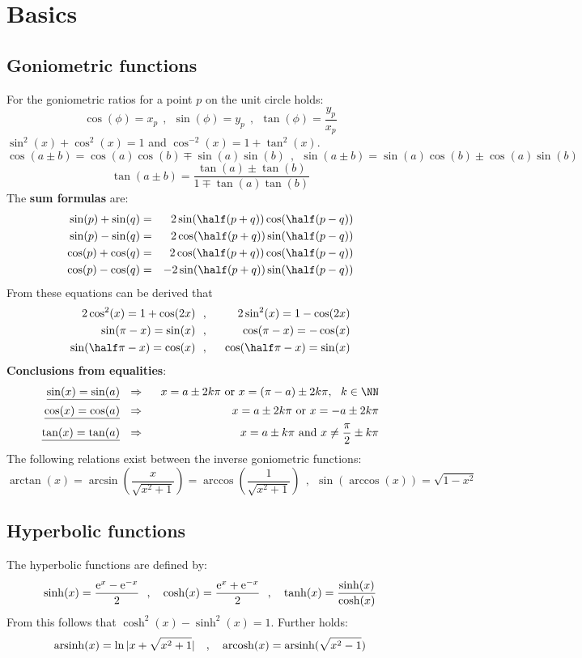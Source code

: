 \chapter{Basics}
\section{Goniometric functions}
For the goniometric ratios for a point $p$ on the unit circle holds:
\[
\cos(\phi)=x_p~~,~~\sin(\phi)=y_p~~,~~\tan(\phi)=\frac{y_p}{x_p}
\]
$\sin^2(x)+\cos^2(x)=1$ and $\cos^{-2}(x)=1+\tan^2(x)$.
\[
\cos(a\pm b)=\cos(a)\cos(b)\mp\sin(a)\sin(b)~~,~~
\sin(a\pm b)=\sin(a)\cos(b)\pm\cos(a)\sin(b)
\]
\[
\tan(a\pm b)=\frac{\tan(a)\pm\tan(b)}{1\mp\tan(a)\tan(b)}
\]
The {\bf sum formulas} are:
\begin{eqnarray*}
\sin(p)+\sin(q)&=&2\sin(\half(p+q))\cos(\half(p-q))\\
\sin(p)-\sin(q)&=&2\cos(\half(p+q))\sin(\half(p-q))\\
\cos(p)+\cos(q)&=&2\cos(\half(p+q))\cos(\half(p-q))\\
\cos(p)-\cos(q)&=&-2\sin(\half(p+q))\sin(\half(p-q))\\
\end{eqnarray*}
From these equations can be derived that
\begin{eqnarray*}
2\cos^2(x)=1+\cos(2x)   &~~,~~&2\sin^2(x)=1-\cos(2x)\\
\sin(\pi-x)=\sin(x)     &~~,~~&\cos(\pi-x)=-\cos(x)\\
\sin(\half\pi-x)=\cos(x)&~~,~~&\cos(\half\pi-x)=\sin(x)
\end{eqnarray*}
{\bf Conclusions from equalities}:
\begin{eqnarray*}
\underline{\sin(x)=\sin(a)}&~~\Rightarrow~~&x=a\pm2k\pi\mbox{ or }x=(\pi-a)\pm2k\pi,~~k\in\NN\\
\underline{\cos(x)=\cos(a)}&~~\Rightarrow~~&x=a\pm2k\pi\mbox{ or }x=-a\pm2k\pi\\
\underline{\tan(x)=\tan(a)}&~~\Rightarrow~~&x=a\pm k\pi\mbox{ and }x\neq\frac{\pi}{2}\pm k\pi
\end{eqnarray*}
The following relations exist between the inverse goniometric functions:
\[
\arctan(x)=\arcsin\left(\frac{x}{\sqrt{x^2+1}}\right)=\arccos\left(\frac{1}{\sqrt{x^2+1}}\right)~~,~~
\sin(\arccos(x))=\sqrt{1-x^2}
\]

\section{Hyperbolic functions}
The hyperbolic functions are defined by:
\[
\sinh(x)=\frac{{\rm e}^x-{\rm e}^{-x}}{2}~~,~~~\cosh(x)=\frac{{\rm e}^x+{\rm e}^{-x}}{2}~~,~~~\tanh(x)=\frac{\sinh(x)}{\cosh(x)}
\]
From this follows that $\cosh^2(x)-\sinh^2(x)=1$. Further holds:
\[
{\rm arsinh}(x)=\ln|x+\sqrt{x^2+1}|~~~,~~~{\rm arcosh}(x)={\rm arsinh}(\sqrt{x^2-1})
\]

